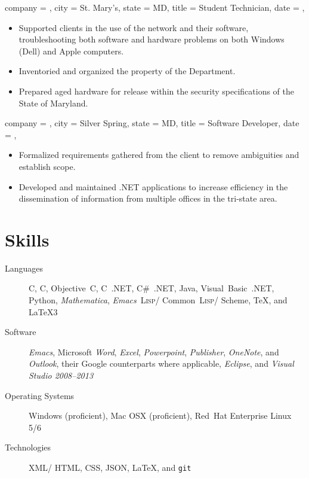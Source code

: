 \documentclass{bettercv}
\newcommand \software[1] {\textsl{#1}}
\newcommand \CPP        {{C\nolinebreak[4]\hspace{-.05em}\raisebox{.4ex}{\tiny\bf ++}}}
\newcommand \CSharp     {{C\#}}
\newcommand \Lisp       {{\textsc{Lisp}}}
\begin{document}
\begin{position}
  {
    company = \smcmoit,
    city    = St. Mary's,
    state   = MD,
    title   = Student Technician,
    date    = ,
  }

\begin{itemize}
\item Supported clients in the use of the network and their software,
  troubleshooting both software and hardware problems on both Windows (Dell) and Apple computers.
\item Inventoried and organized the property of the Department.
\item Prepared aged hardware for release within the security specifications of the State of Maryland.
\end{itemize}
\end{position}

\begin{position}
  {
    company = \cwc,
    city    = Silver Spring,
    state   = MD,
    title   = Software Developer,
    date    = ,
  }

\begin{itemize}
\item Formalized requirements gathered from the client to remove ambiguities and establish scope.
\item Developed and maintained .NET applications to increase efficiency in the dissemination of information from multiple offices in the tri-state area.
\end{itemize}
\end{position}

\section{Skills}

\begin{description}
\item[Languages]
  C,
  \CPP,
  Objective~C,
  \CPP~.NET,
  \CSharp~.NET,
  Java,
  Visual~Basic~.NET,
  Python,
  \software{Mathematica},
  \software{Emacs}~\Lisp\slash
            Common~\Lisp\slash
            Scheme,
  \TeX,
  and \LaTeX3

\item[Software]
  \software{Emacs},
  Microsoft \software{Word},
            \software{Excel},
            \software{Powerpoint},
            \software{Publisher},
            \software{OneNote},
            and \software{Outlook},
  their Google counterparts where applicable,
  \software{Eclipse},
  and \software{Visual Studio 2008--2013}

\item[Operating Systems]
  Windows (proficient),
  Mac OSX (proficient),
  Red~Hat Enterprise Linux 5\slash 6

\item[Technologies]
  XML\slash
  HTML,
  CSS,
  JSON,
  \LaTeX,
  and \texttt{git}
\end{description}
\end{document}
